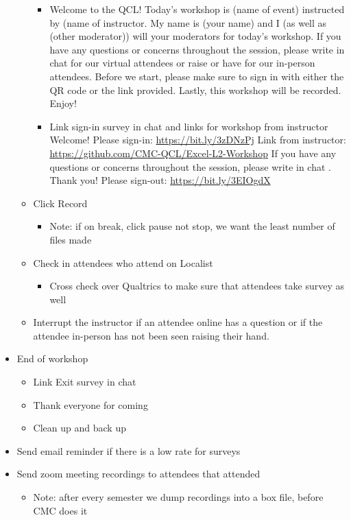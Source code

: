 \documentclass[
]{book}
\providecommand{\tightlist}{%
  \setlength{\itemsep}{0pt}\setlength{\parskip}{0pt}}
\begin{document}
\begin{itemize}
\begin{itemize}
    \begin{itemize}
    \tightlist
    \item
      Welcome to the QCL! Today's workshop is (name of event) instructed by (name of instructor. My name is (your name) and I (as well as (other moderator)) will your moderators for today's workshop. If you have any questions or concerns throughout the session, please write in chat for our virtual attendees or raise or have for our in-person attendees. Before we start, please make sure to sign in with either the QR code or the link provided. Lastly, this workshop will be recorded. Enjoy!
    \item
      Link sign-in survey in chat and links for workshop from instructor
      Welcome! Please sign-in: \url{https://bit.ly/3zDNzPj}
      Link from instructor: \url{https://github.com/CMC-QCL/Excel-L2-Workshop}
      If you have any questions or concerns throughout the session, please write in chat \citet{everyone}.
      Thank you! Please sign-out: \url{https://bit.ly/3EIOgdX}
    \end{itemize}
  \item
    Click Record

    \begin{itemize}
    \tightlist
    \item
      Note: if on break, click pause not stop, we want the least number of files made
    \end{itemize}
  \item
    Check in attendees who attend on Localist

    \begin{itemize}
    \tightlist
    \item
      Cross check over Qualtrics to make sure that attendees take survey as well
    \end{itemize}
  \item
    Interrupt the instructor if an attendee online has a question or if the attendee in-person has not been seen raising their hand.
  \end{itemize}
\item
  End of workshop

  \begin{itemize}
  \tightlist
  \item
    Link Exit survey in chat
  \item
    Thank everyone for coming
  \item
    Clean up and back up
  \end{itemize}
\item
  Send email reminder if there is a low rate for surveys
\item
  Send zoom meeting recordings to attendees that attended

  \begin{itemize}
  \tightlist
  \item
    Note: after every semester we dump recordings into a box file, before CMC does it
  \end{itemize}
\end{itemize}
\end{document}

